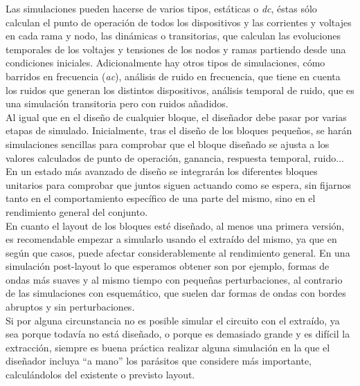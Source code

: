 Las simulaciones pueden hacerse de varios tipos, estáticas o \textit{dc}, éstas
sólo calculan el punto de operación de todos los dispositivos y las corrientes y
voltajes en cada rama y nodo, las dinámicas o transitorias, que calculan las
evoluciones temporales de los voltajes y tensiones de los nodos y ramas partiendo
desde una condiciones iniciales. Adicionalmente hay otros tipos de simulaciones,
cómo barridos en frecuencia (\textit{ac}), análisis de ruido en frecuencia, que
tiene en cuenta los ruidos que generan los distintos dispositivos, análisis temporal
de ruido, que es una simulación transitoria pero con ruidos añadidos.\\

Al igual que en el diseño de cualquier bloque, el diseñador debe pasar por varias
etapas de simulado. Inicialmente, tras el diseño de los bloques pequeños, se harán
simulaciones sencillas para comprobar que el bloque diseñado se ajusta a los valores
calculados de punto de operación, ganancia, respuesta temporal, ruido...\\

En un estado más avanzado de diseño se integrarán los diferentes bloques unitarios
para comprobar que juntos siguen actuando como se espera, sin fijarnos tanto en el
comportamiento específico de una parte del mismo, sino en el rendimiento general del
conjunto.\\

En cuanto el layout de los bloques esté diseñado, al menos una primera versión, es
recomendable empezar a simularlo usando el extraído del mismo, ya que en según que
casos, puede afectar considerablemente al rendimiento general. En una simulación
post-layout lo que esperamos obtener son por ejemplo, formas de ondas más suaves
y al mismo tiempo con pequeñas perturbaciones, al contrario de las simulaciones
con esquemático, que suelen dar formas de ondas con bordes abruptos y sin perturbaciones.\\

Si por alguna circunstancia no es posible simular el circuito con el extraído, ya
sea porque todavía no está diseñado, o porque es demasiado grande y es difícil
la extracción, siempre es buena práctica realizar alguna simulación en la que el
diseñador incluya ``a mano'' los parásitos que considere más importante,
calculándolos del existente o previsto layout.\\

